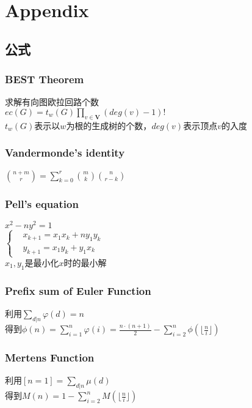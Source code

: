 \section{Appendix}

\subsection{公式}

\subsubsection{BEST Theorem}
求解有向图欧拉回路个数 \\
$ec(G)=t_w(G)\prod_{v \in \mathbf{V}}(deg(v) - 1 )!$ \\
$t_w(G)$表示以$w$为根的生成树的个数，$deg(v)$表示顶点$v$的入度

\subsubsection{Vandermonde's identity}
$\binom{n+m}{r}=\sum_{k=0}^{r}\binom{m}{k}\binom{n}{r-k}$

\subsubsection{Pell's equation}
$x^2-ny^2=1$\\
$
\left\{
\begin{aligned}
&x_{k+1}=x_1x_k+ny_1y_k \\
&y_{k+1}=x_1y_k+y_1x_k
\end{aligned}
\right.
$\\
$x_1,y_1$是最小化$x$时的最小解

\subsubsection{Prefix sum of Euler Function}
利用$\sum_{d|n}{\varphi(d)}=n$\\
得到$\phi(n)=\sum_{i=1}^{n}{\varphi(i)}=\frac{n\cdot(n+1)}{2}-\sum_{i=2}^{n}{\phi(\lfloor\frac{n}{i}\rfloor)}$

\subsubsection{Mertens Function}
利用$[n=1]=\sum_{d|n}{\mu(d)}$\\
得到$M(n)=1-\sum_{i=2}^{n}{M(\lfloor\frac{n}{i}\rfloor)}$

